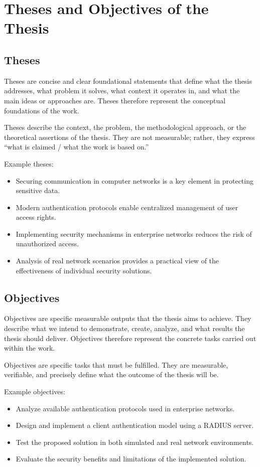 \section*{Theses and Objectives of the \typeofwork{} Thesis}

\normalsize

\subsection*{Theses}

Theses are concise and clear foundational statements that define what the thesis addresses, what problem it solves, what context it operates in, and what the main ideas or approaches are. Theses therefore represent the conceptual foundations of the work.

Theses describe the context, the problem, the methodological approach, or the theoretical assertions of the thesis.
They are not measurable; rather, they express “what is claimed / what the work is based on.”

Example theses:

\begin{itemize}
	\item Securing communication in computer networks is a key element in protecting sensitive data.
	\item Modern authentication protocols enable centralized management of user access rights.
	\item Implementing security mechanisms in enterprise networks reduces the risk of unauthorized access.
	\item Analysis of real network scenarios provides a practical view of the effectiveness of individual security solutions.
\end{itemize}


\subsection*{Objectives}

Objectives are specific measurable outputs that the thesis aims to achieve. They describe what we intend to demonstrate, create, analyze, and what results the thesis should deliver. Objectives therefore represent the concrete tasks carried out within the work.

Objectives are specific tasks that must be fulfilled. They are measurable, verifiable, and precisely define what the outcome of the thesis will be.

Example objectives:

\begin{itemize}
	\item Analyze available authentication protocols used in enterprise networks.
	\item Design and implement a client authentication model using a RADIUS server.
	\item Test the proposed solution in both simulated and real network environments.
	\item Evaluate the security benefits and limitations of the implemented solution.
\end{itemize}

\newpage
